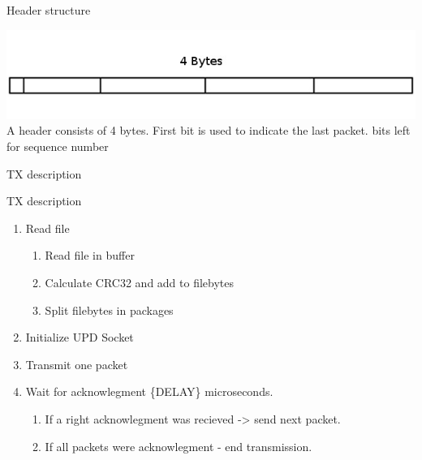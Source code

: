 \documentclass[10pt]{beamer}
\begin{document}
\begin{frame}[fragile]{Header structure}

  \includegraphics[width=\linewidth]{header}
  \newline
  A header consists of 4 bytes. 
  \newline
  First bit is used to indicate the last packet. 
   bits left for sequence number

\end{frame}


\begin{frame}[fragile]{TX description}
	\begin{block}{TX description}
		\begin{enumerate}
		\item Read file
		\begin{enumerate}
			\item Read file in buffer
			\item Calculate CRC32 and add to filebytes
			\item Split filebytes in packages
		\end{enumerate}
		\item Initialize UPD Socket
		\item Transmit one packet
		\item Wait for acknowlegment \{DELAY\} microseconds.
		\begin{enumerate}
			\item If a right acknowlegment was recieved -> send next packet.
			\item If all packets were acknowlegment - end transmission. 
		\end{enumerate}
		\end{enumerate}
	\end{block}
\end{frame}
\end{document}
